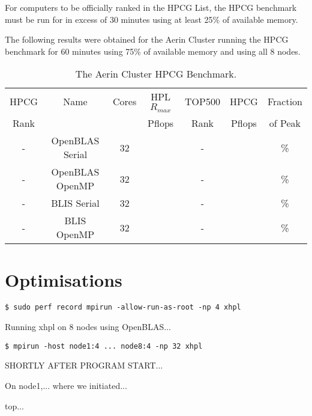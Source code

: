 For computers to be officially ranked in the HPCG List, the HPCG benchmark must be run for in excess of 30 minutes using at least 25\% of available memory.

The following results were obtained for the Aerin Cluster running the HPCG benchmark for 60 minutes using 75\% of available memory and using all 8 nodes.

\begin{table}[H]
\begin{center}
\begin{tabular}{ |c|c|c|c|c|c|c| }
\hline
HPCG & Name & Cores & HPL $R_{max}$ & TOP500 & HPCG   & Fraction \\
Rank &      &       & Pflops        & Rank   & Pflops & of Peak  \\
\hline
- & OpenBLAS Serial & 32 & & - & & \% \\
\hline
- & OpenBLAS OpenMP & 32 & & - & & \% \\
\hline
- & BLIS Serial & 32 & & - & & \% \\
\hline
- & BLIS OpenMP & 32 & & - & & \% \\
\hline
\end{tabular}
\end{center}
\caption{\label{tab:table-name}The Aerin Cluster HPCG Benchmark.}
\end{table}


%
%
\section{Optimisations}


\lstset{style=type}
\begin{lstlisting}
$ sudo perf record mpirun -allow-run-as-root -np 4 xhpl
\end{lstlisting}



Running xhpl on 8 nodes using OpenBLAS...

\lstset{style=type}
\begin{lstlisting}
$ mpirun -host node1:4 ... node8:4 -np 32 xhpl
\end{lstlisting}


SHORTLY AFTER PROGRAM START...

On node1,... where we initiated...

top...

